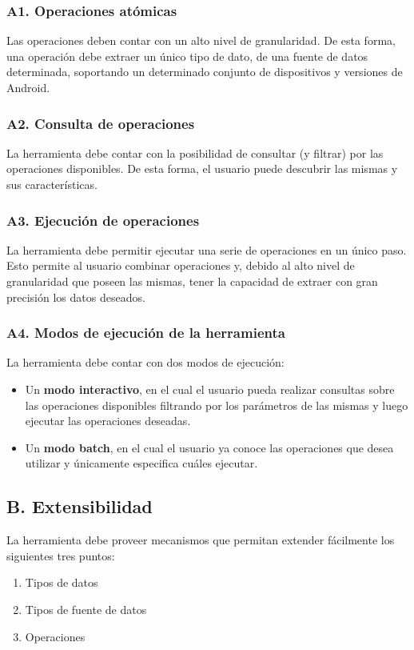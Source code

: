 \subsubsection*{A1. Operaciones atómicas}
\label{reqA1}
Las operaciones deben contar con un alto nivel de granularidad. De esta forma, una operación debe extraer un único tipo de dato, de una fuente de datos determinada, soportando un determinado conjunto de dispositivos y versiones de Android.

\subsubsection*{A2. Consulta de operaciones}
\label{reqA2}
La herramienta debe contar con la posibilidad de consultar (y filtrar) por las operaciones disponibles. De esta forma, el usuario puede descubrir las mismas y sus características.

\subsubsection*{A3. Ejecución de operaciones}
\label{reqA3}
La herramienta debe permitir ejecutar una serie de operaciones en un único paso. Esto permite al usuario combinar operaciones y, debido al alto nivel de granularidad que poseen las mismas, tener la capacidad de extraer con gran precisión los datos deseados.

\subsubsection*{A4. Modos de ejecución de la herramienta}
\label{reqA4}
La herramienta debe contar con dos modos de ejecución:
\begin{itemize}
\item Un \textbf{modo interactivo}, en el cual el usuario pueda realizar consultas sobre las operaciones disponibles filtrando por los parámetros de las mismas y luego ejecutar las operaciones deseadas.
\item Un \textbf{modo batch}, en el cual el usuario ya conoce las operaciones que desea utilizar y únicamente especifica cuáles ejecutar.
\end{itemize}

\subsection*{B. Extensibilidad}
\label{reqB}
La herramienta debe proveer mecanismos que permitan extender fácilmente los siguientes tres puntos:
\begin{enumerate}[topsep=0pt, parsep=0pt, partopsep=0pt]
\item Tipos de datos
\item Tipos de fuente de datos
\item Operaciones
\end{enumerate}

